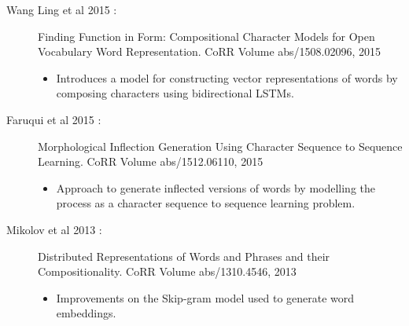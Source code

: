 \documentclass[11pt, a4paper, landscape]{article}
\begin{document}
\NewPage{} 
\vfill
\begin{description}

\item [Wang Ling et al 2015 :] Finding Function in Form: Compositional Character Models for Open 
      Vocabulary Word Representation. CoRR Volume abs/1508.02096, 2015 
  \begin{itemize}
  \item Introduces a model for constructing vector representations of words by composing characters using bidirectional LSTMs.
  \end{itemize}

\item [Faruqui et al 2015 :] Morphological Inflection Generation Using Character Sequence to Sequence Learning. CoRR Volume abs/1512.06110, 2015 
  \begin{itemize}
  \item Approach to generate inflected versions of words by modelling the process as a character sequence to sequence learning problem.
  \end{itemize}

\item [Mikolov et al 2013 :] Distributed Representations of Words and Phrases and their Compositionality. CoRR Volume abs/1310.4546, 2013 
  \begin{itemize}
  \item Improvements on the Skip-gram model used to generate word embeddings.
  \end{itemize}

\end{description}
\vfill
\end{document}
